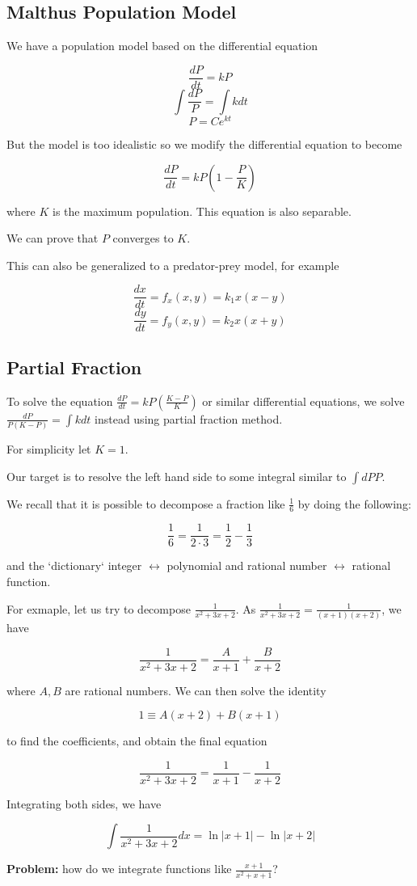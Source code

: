 \subsection{Malthus Population Model}

We have a population model based on the differential equation

$$ \frac{dP}{dt} = kP $$
$$ \int \frac{dP}{P} = \int k dt $$
$$ P = Ce^{kt} $$

But the model is too idealistic so we modify the differential equation to become

$$ \frac{dP}{dt} = kP(1 - \frac{P}{K}) $$

where $K$ is the maximum population. This equation is also separable.

We can prove that $P$ converges to $K$.

This can also be generalized to a predator-prey model, for example

$$ \frac{dx}{dt} = f_x(x, y) = k_1 x (x-y) $$
$$ \frac{dy}{dt} = f_y(x, y) = k_2 x (x+y) $$

\subsection{Partial Fraction}

To solve the equation $ \frac{dP}{dt} = kP(\frac{K-P}{K}) $ or similar differential equations, we solve $ \frac{dP}{P(K-P)} = \int k dt $ instead using partial fraction method.

For simplicity let $K = 1$.

Our target is to resolve the left hand side to some integral similar to $\int{dP}{P}$.

We recall that it is possible to decompose a fraction like $\frac{1}{6}$ by doing the following:

$$ \frac{1}{6} = \frac{1}{2 \cdot 3} = \frac{1}{2} - \frac{1}{3} $$

and the `dictionary` integer $\longleftrightarrow$ polynomial and rational number $\longleftrightarrow$ rational function.

For exmaple, let us try to decompose $\frac{1}{x^2+3x+2}$. As $\frac{1}{x^2+3x+2}=\frac{1}{(x+1)(x+2)}$, we have

$$ \frac{1}{x^2+3x+2} = \frac{A}{x+1}+\frac{B}{x+2} $$

where $A, B$ are rational numbers. We can then solve the identity

$$ 1 \equiv A(x+2) + B(x+1) $$

to find the coefficients, and obtain the final equation

$$ \frac{1}{x^2+3x+2} = \frac{1}{x+1} - \frac{1}{x+2} $$

Integrating both sides, we have

$$ \int \frac{1}{x^2+3x+2} dx = \ln |x+1| - \ln |x+2| $$

\textbf{Problem:} how do we integrate functions like $\frac{x + 1}{x^2 + x + 1}$?
